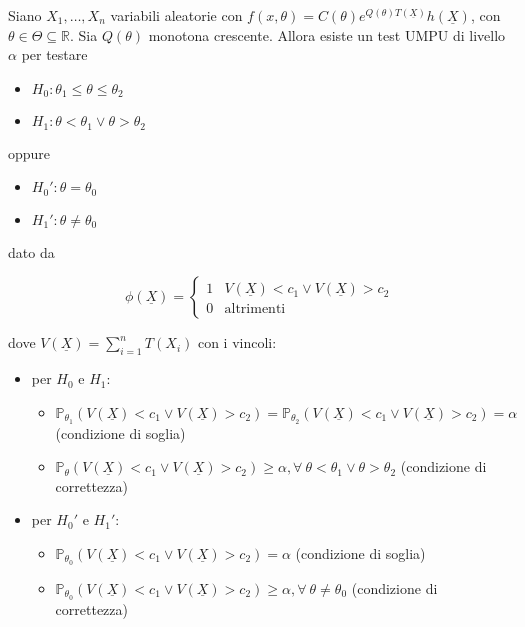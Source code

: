 \documentclass[hidelinks, 10pt]{report}
\begin{document}
\begin{thm}
Siano $ X_{1}, \dotsc, X_{n} $ variabili aleatorie con $ f(x, \theta) = C(\theta) e^{Q(\theta) T(\underline{X})} h(\underline{X}) $, con $ \theta \in \Theta \subseteq \mathbb{R} $. Sia $ Q(\theta) $ monotona crescente. Allora esiste un test UMPU di livello $ \alpha $ per testare
\begin{itemize}
\item $ H_{0}: \theta_{1} \le \theta \le \theta_{2} $
\item $ H_{1}: \theta < \theta_{1} \lor \theta > \theta_{2} $
\end{itemize}

oppure

\begin{itemize}
\item $ H_{0}': \theta = \theta_{0} $
\item $ H_{1}': \theta \ne \theta_{0} $
\end{itemize}

dato da

\[ \phi (\underline{X}) = \begin{cases}
1 & V(\underline{X}) < c_{1} \lor V(\underline{X}) > c_{2} \\
0 & \text{altrimenti}
\end{cases} \]

dove $ V(\underline{X}) = \sum\limits_{i = 1}^{n} T(X_{i}) $ con i vincoli:
\begin{itemize}
\item per $ H_{0} $ e $ H_{1} $:
\begin{itemize}
\item $ \mathbb{P}_{\theta_{1}} (V(\underline{X}) < c_{1} \lor V(\underline{X}) > c_{2}) = \mathbb{P}_{\theta_{2}} (V(\underline{X}) < c_{1} \lor V(\underline{X}) > c_{2}) = \alpha $ (condizione di soglia)
\item $ \mathbb{P}_{\theta} (V(\underline{X}) < c_{1} \lor V(\underline{X}) > c_{2}) \ge \alpha, \forall\ \theta < \theta_{1} \lor \theta > \theta_{2} $ (condizione di correttezza)
\end{itemize}
\item per $ H_{0}' $ e $ H_{1}' $:
\begin{itemize}
\item $ \mathbb{P}_{\theta_{0}} (V(\underline{X}) < c_{1} \lor V(\underline{X}) > c_{2}) = \alpha $ (condizione di soglia)
\item $ \mathbb{P}_{\theta_{0}} (V(\underline{X}) < c_{1} \lor V(\underline{X}) > c_{2}) \ge \alpha, \forall\ \theta \ne \theta_{0} $ (condizione di correttezza)
\end{itemize}
\end{itemize}
\end{thm}
\end{document}
